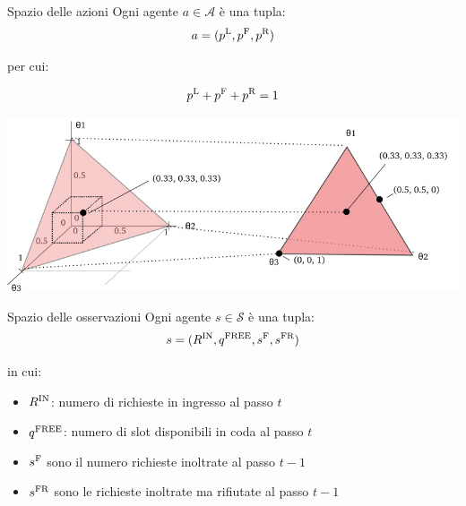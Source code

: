 \documentclass[]{beamer}
\begin{document}
\begin{frame}{Spazio delle azioni}
    Ogni agente $a \in \mathcal{A}$ è una tupla:
    \begin{equation*}
        a = (p^{\textnormal{L}}, p^{\textnormal{F}}, p^{\textnormal{R}})
    \end{equation*}

    per cui:

    \begin{equation*}
        p^{\textnormal{L}} + p^{\textnormal{F}} + p^{\textnormal{R}} = 1
    \end{equation*}

    \centering
    \includegraphics[width=.75\textwidth]{assets/4/simplex_5.png}
\end{frame}

\begin{frame}{Spazio delle osservazioni}
    Ogni agente $s \in \mathcal{S}$ è una tupla:
    \begin{equation*}
        s = (R^{\textnormal{IN}}, q^{\textnormal{FREE}}, s^{\textnormal{F}}, s^{\textnormal{FR}})
    \end{equation*}

    in cui:

    \begin{itemize}
        \item $R^{\textnormal{IN}}$: numero di richieste in ingresso al passo $t$

        \item $q^{\textnormal{FREE}}$: numero di slot disponibili in coda al passo $t$

        \item $s^{\textnormal{F}}$ sono il numero richieste inoltrate al passo $t-1$

        \item $s^{\textnormal{FR}}$ sono le richieste inoltrate ma rifiutate al passo $t-1$
    \end{itemize}
\end{frame}
\end{document}

